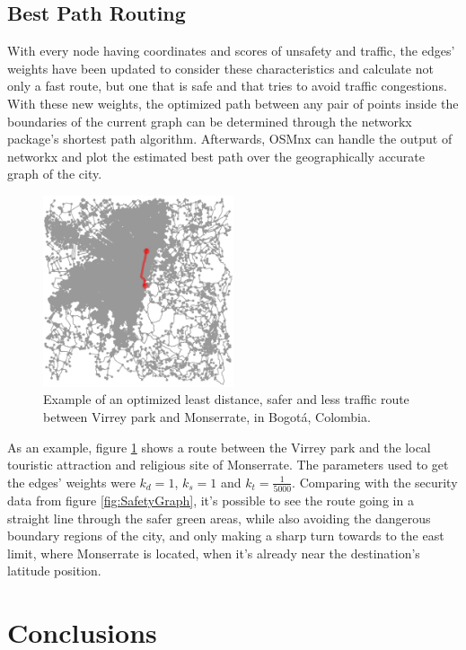 \documentclass[runningheads]{llncs}
\begin{document}
\subsection{Best Path Routing}

With every node having coordinates and scores of unsafety and traffic, the edges' weights have been updated to consider these characteristics and calculate not only a fast route, but one that is safe and that tries to avoid traffic congestions. With these new weights, the optimized path between any pair of points inside the boundaries of the current graph can be determined through the networkx package's shortest path algorithm. Afterwards, OSMnx can handle the output of networkx and plot the estimated best path over the geographically accurate graph of the city.

\begin{figure}[!h]
	\centering
	\includegraphics[width=0.5\textwidth]{Images/GrafoBogotaRutaConPesos}
	\caption{Example of an optimized least distance, safer and less traffic route between Virrey park and Monserrate, in Bogotá, Colombia.}
    \label{fig:ExampleBestRoute}
\end{figure}

As an example, figure \ref{fig:ExampleBestRoute} shows a route between the Virrey park and the local touristic attraction and religious site of Monserrate. The parameters used to get the edges' weights were $k_d = 1$, $k_s = 1$ and $k_t = \frac{1}{5000}$. Comparing with the security data from figure \ref{fig:SafetyGraph}, it's possible to see the route going in a straight line through the safer green areas, while also avoiding the dangerous boundary regions of the city, and only making a sharp turn towards to the east limit, where Monserrate is located, when it's already near the destination's latitude position.

\section{Conclusions}
\end{document}
